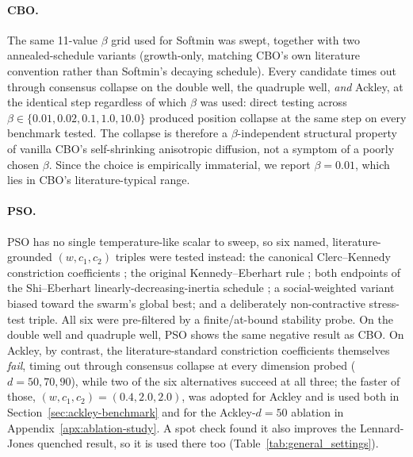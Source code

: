 \documentclass{article} %
\theoremstyle{plain}
\theoremstyle{definition}
\theoremstyle{remark}
\begin{document}
\paragraph{CBO.} The same 11-value $\beta$ grid used for Softmin was swept, together with two annealed-schedule variants (growth-only, matching CBO's own literature convention rather than Softmin's decaying schedule). Every candidate times out through consensus collapse on the double well, the quadruple well, \emph{and} Ackley, at the identical step regardless of which $\beta$ was used: direct testing across $\beta\in\{0.01,0.02,0.1,1.0,10.0\}$ produced position collapse at the same step on every benchmark tested. The collapse is therefore a $\beta$-independent structural property of vanilla CBO's self-shrinking anisotropic diffusion, not a symptom of a poorly chosen $\beta$. Since the choice is empirically immaterial, we report $\beta=0.01$, which lies in CBO's literature-typical range.

\paragraph{PSO.} PSO has no single temperature-like scalar to sweep, so six named, literature-grounded $(w,c_1,c_2)$ triples were tested instead: the canonical Clerc--Kennedy constriction coefficients \citep{clerc2002particle}; the original Kennedy--Eberhart rule \citep{kennedy1995particle}; both endpoints of the Shi--Eberhart linearly-decreasing-inertia schedule \citep{shi1998modified}; a social-weighted variant biased toward the swarm's global best; and a deliberately non-contractive stress-test triple. All six were pre-filtered by a finite/at-bound stability probe. On the double well and quadruple well, PSO shows the same negative result as CBO. On Ackley, by contrast, the literature-standard constriction coefficients themselves \emph{fail}, timing out through consensus collapse at every dimension probed ($d=50,70,90$), while two of the six alternatives succeed at all three; the faster of those, $(w,c_1,c_2)=(0.4,2.0,2.0)$, was adopted for Ackley and is used both in Section~\ref{sec:ackley-benchmark} and for the Ackley-$d{=}50$ ablation in Appendix~\ref{apx:ablation-study}. A spot check found it also improves the Lennard-Jones quenched result, so it is used there too (Table~\ref{tab:general_settings}).
\end{document}
